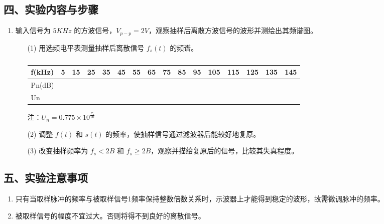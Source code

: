 \documentclass[dvipsnames, svgnames,a4paper,11pt]{article}
\begin{document}
\subsection*{四、实验内容与步骤}
\begin{enumerate}
  \item 输入信号为 $5KHz$ 的方波信号，$V_{p-p} = 2V$，观察抽样后离散方波信号的波形并测绘出其频谱图。
  \begin{enumerate}
    \item[(1)] 用选频电平表测量抽样后离散信号 $f_s(t)$ 的频谱。 
    \begin{table}[htbp]
      \renewcommand\arraystretch{1.7}
      \centering
      \caption{}
      \begin{tabularx}{\textwidth}{|p{}|X|X|X|X|X|X|X|X|X|X|X|X|X|X|X|}
        \hline
        f(kHz) & 5 & 15 & 25 & 35 & 45 & 55 & 65 & 75 & 85 & 95 & 105 & 115 & 125 & 135 & 145 \\
        \hline
        Pn(dB) &  &  &  &  &  &  &  &  &  &  &  &  &  &  & \\
        \hline
        Un &  &  &  &  &  &  &  &  &  &  &  &  &  &  & \\
        \hline
      \end{tabularx}
    \end{table}
    
    注：$U_n = 0.775 \times 10^{\frac{P_n}{20}}$

    \item[(2)] 调整 $f(t)$ 和 $s(t)$ 的频率，使抽样信号通过滤波器后能较好地复原。
    \item[(3)] 改变抽样频率为 $f_s < 2B$ 和 $f_s \ge 2B$，观察并描绘复原后的信号，比较其失真程度。
  \end{enumerate}
\end{enumerate}

\subsection*{五、实验注意事项}
\begin{enumerate}
  \item 只有当取样脉冲的频率与被取样信号1频率保持整数倍数关系时，示波器上才能得到稳定的波形，故需微调脉冲的频率。
  \item 被取样信号的幅度不宜过大。否则将得不到良好的离散信号。
\end{enumerate}
\end{document}
